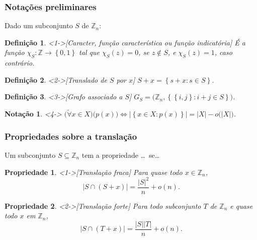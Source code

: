 \documentclass{beamer}
\def\MMZ{\mathbb{Z}} %
\def\MMp{\mathrm{.}} %
\def\chaves#1{\left\{ #1 \right\}} %
\def\cardi#1{\lvert #1 \rvert} %
\def\funcao#1#2#3{#1\colon #2\rightarrow #3} %
\def\cj#1{\chaves{#1}} %
\def\cjpp#1#2{\chaves{#1\colon#2}} %
\def\foraa{\tilde{\forall}}
\theoremstyle{teoaxicorlem}
\newtheorem{Propr}{Propriedade}
\theoremstyle{defnotnom}
\newtheorem{Def}{Definição}
\newtheorem{Not}{Notação}
\begin{document}
\begin{frame}
  \frametitle{Notações preliminares}
  \footnotesize
  Dado um subconjunto $S$ de $\MMZ_n$:
  \begin{Def}<1->[Caracter, função característica ou função indicatória]
    \footnotesize
    É a função
    $\funcao{\chi_S}{\MMZ}{\cj{0,1}}$ tal que $\chi_S(z) = 0$, se
    $z\notin S$, e $\chi_S(z) = 1$, caso contrário.
  \end{Def}
  \vfill
  \begin{Def}<2->[Translado de $S$ por $x$]
    $S+x = \cjpp{s+x}{s\in S}$.
  \end{Def}
  \vfill
  \begin{Def}<3->[Grafo associado a $S$]
    $G_S = \bigl(\MMZ_n,\cjpp{\cj{i,j}}{i+j\in S}\bigr)$.
  \end{Def}
  \begin{Not}<4->
    $\bigl(\foraa x\in X\bigr)\bigl(p(x)\bigr) \Longleftrightarrow
    \cardi{\cjpp{x\in X}{p(x)}} = \cardi{X} - o\bigl(\cardi{X}\bigr)$.
  \end{Not}
\end{frame}

\begin{frame}
  \frametitle{Propriedades sobre a translação}
  Um subconjunto $S\subseteq\MMZ_n$ tem a propriedade \dots\ se\dots
  \begin{Propr}<1->[Translação fraca]
    Para quase todo $x\in\MMZ_n$,
    \begin{equation*}
      \cardi{S\cap (S+x)} = \frac{\cardi{S}^2}{n} + o(n)\MMp
    \end{equation*}
  \end{Propr}
  \vfill
  \begin{Propr}<2->[Translação forte]
    Para todo subconjunto $T$ de $\MMZ_n$ e quase todo $x$ em $\MMZ_n$,
    \begin{equation*}
      \cardi{S\cap (T+x)} = \frac{\cardi{S}\cardi{T}}{n} + o(n)\MMp
    \end{equation*}
  \end{Propr}
\end{frame}
\end{document}
